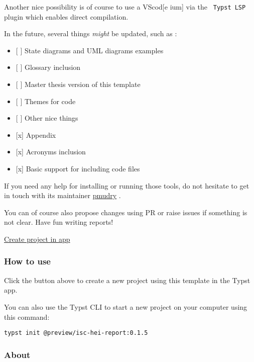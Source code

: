 Another nice possibility is of course to use a VScod{[}e \textbar{}
ium{]} via the \texttt{\ Typst\ LSP\ } plugin which enables direct
compilation.

In the future, several things \emph{might} be updated, such as :

\begin{itemize}
\tightlist
\item
  {[} {]} State diagrams and UML diagrams examples
\item
  {[} {]} Glossary inclusion
\item
  {[} {]} Master thesis version of this template
\item
  {[} {]} Themes for code
\item
  {[} {]} Other nice things
\item
  {[}x{]} Appendix
\item
  {[}x{]} Acronyms inclusion
\item
  {[}x{]} Basic support for including code files
\end{itemize}

If you need any help for installing or running those tools, do not
hesitate to get in touch with its maintainer
\href{https://github.com/pmudry}{pmudry} .

You can of course also propose changes using PR or raise issues if
something is not clear. Have fun writing reports!

\href{/app?template=isc-hei-report&version=0.1.5}{Create project in app}

\subsubsection{How to use}\label{how-to-use}

Click the button above to create a new project using this template in
the Typst app.

You can also use the Typst CLI to start a new project on your computer
using this command:

\begin{verbatim}
typst init @preview/isc-hei-report:0.1.5
\end{verbatim}



\subsubsection{About}\label{about}

